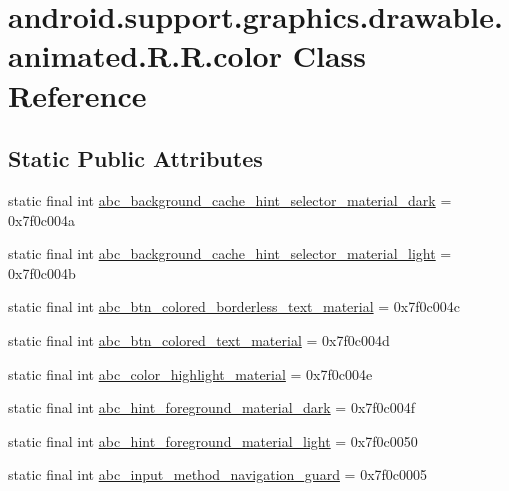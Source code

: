 \hypertarget{classandroid_1_1support_1_1graphics_1_1drawable_1_1animated_1_1_r_1_1color}{
\section{android.support.graphics.drawable.animated.R.R.color Class Reference}
\label{classandroid_1_1support_1_1graphics_1_1drawable_1_1animated_1_1_r_1_1color}
}
\subsection*{Static Public Attributes}
\begin{CompactItemize}
\item 
static final int \hyperlink{classandroid_1_1support_1_1graphics_1_1drawable_1_1animated_1_1_r_1_1color_d3bfc8faff86a95db256aa0e1a1cc37e}{abc\_\-background\_\-cache\_\-hint\_\-selector\_\-material\_\-dark} = 0x7f0c004a
\item 
static final int \hyperlink{classandroid_1_1support_1_1graphics_1_1drawable_1_1animated_1_1_r_1_1color_40748aef866fd2408cda3787d753bcb7}{abc\_\-background\_\-cache\_\-hint\_\-selector\_\-material\_\-light} = 0x7f0c004b
\item 
static final int \hyperlink{classandroid_1_1support_1_1graphics_1_1drawable_1_1animated_1_1_r_1_1color_3dde8359f1aa2662345d46bc11558509}{abc\_\-btn\_\-colored\_\-borderless\_\-text\_\-material} = 0x7f0c004c
\item 
static final int \hyperlink{classandroid_1_1support_1_1graphics_1_1drawable_1_1animated_1_1_r_1_1color_3a0f94b5e244769c4d663def291849fd}{abc\_\-btn\_\-colored\_\-text\_\-material} = 0x7f0c004d
\item 
static final int \hyperlink{classandroid_1_1support_1_1graphics_1_1drawable_1_1animated_1_1_r_1_1color_4a1bb470c1c0a232f4b64816d133c282}{abc\_\-color\_\-highlight\_\-material} = 0x7f0c004e
\item 
static final int \hyperlink{classandroid_1_1support_1_1graphics_1_1drawable_1_1animated_1_1_r_1_1color_ac6f47a931f26664b145ad81b075416b}{abc\_\-hint\_\-foreground\_\-material\_\-dark} = 0x7f0c004f
\item 
static final int \hyperlink{classandroid_1_1support_1_1graphics_1_1drawable_1_1animated_1_1_r_1_1color_9174171e68a8edb4414afe33eb676442}{abc\_\-hint\_\-foreground\_\-material\_\-light} = 0x7f0c0050
\item 
static final int \hyperlink{classandroid_1_1support_1_1graphics_1_1drawable_1_1animated_1_1_r_1_1color_48f6f05777b59cb29c913df2bf4a9783}{abc\_\-input\_\-method\_\-navigation\_\-guard} = 0x7f0c0005

\end{CompactItemize}
